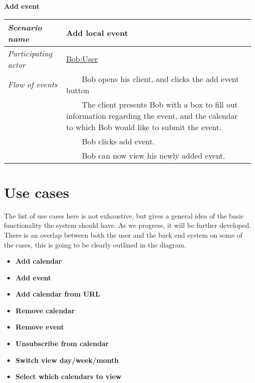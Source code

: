 \documentclass[10pt]{report}
\newcommand{\tabitem}{~~\llap{\textbullet}~~}
\numberwithin{equation}{section} %
\numberwithin{figure}{section} %
\numberwithin{table}{section} %
\begin{document}
\begin{table}[H]
\noindent \textbf{Add event}\\
\begin{tabularx}{\textwidth}{l X}
\midrule
\textit{Scenario name} & Add local event \\ \midrule
\textit{Participating actor} & \underline{Bob:User} \\ \midrule
\textit{Flow of events} & \tabitem Bob opens his client, and clicks the add
                                       event button \\
                                       & \tabitem The client presents Bob with
                                       a box to fill out information regarding
                                       the event, and the calendar to which Bob
                                       would like to submit the event.  \\
                                       & \tabitem Bob clicks add event.  \\
                                       & \tabitem Bob can now view his newly
                                       added event. \\
                                       \midrule
\end{tabularx}
\end{table}

\section{Use cases}
The list of use cases here is not exhaustive, but gives a general idea of the
basic functionality the system should have. As we progress, it will be further
developed. There is an overlap between both the user and the back end system on
some of the cases, this is going to be clearly outlined in the diagram.
\begin{itemize}
\item \textbf{Add calendar}
\item \textbf{Add event}
\item \textbf{Add calendar from URL}
\item \textbf{Remove calendar }
\item \textbf{Remove event}
\item \textbf{Unsubscribe from calendar}
\item \textbf{Switch view day/week/month}
\item \textbf{Select which calendars to view}
\end{itemize}
\end{document}
